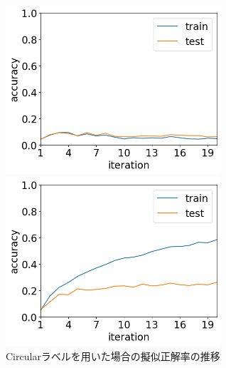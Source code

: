 \documentclass[11pt,a4paper,uplatex]{ujarticle}
\begin{document}
  \begin{figure}[tbp]
    \begin{minipage}[b]{0.495\textwidth}
      \centering
      \includegraphics[keepaspectratio, width=80mm]{Images/python/accuracy_202402052108.png}
    \end{minipage}
    \begin{minipage}[b]{0.495\textwidth}
      \centering
      \includegraphics[keepaspectratio, width=80mm]{Images/python/accuracy_202402052149.png}
    \end{minipage}
    \caption{Circularラベルを用いた場合の擬似正解率の推移}
    \label{fig:acc_circular}
  \end{figure}
  \clearpage
\end{document}
